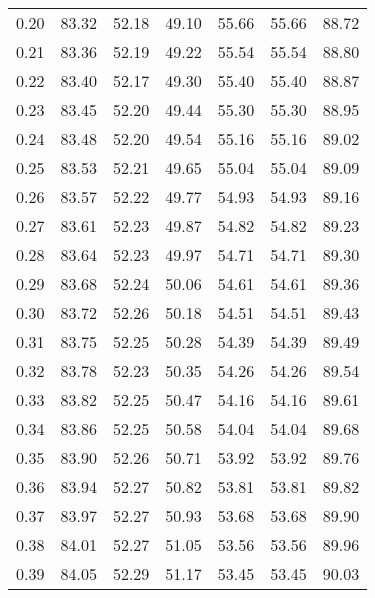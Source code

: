 \begin{tabular}{|c|c|c|c|c|c|c|}
      0.20 &     83.32 &     52.18 &      49.10 &   55.66 &      55.66 &         88.72 \\
      0.21 &     83.36 &     52.19 &      49.22 &   55.54 &      55.54 &         88.80 \\
      0.22 &     83.40 &     52.17 &      49.30 &   55.40 &      55.40 &         88.87 \\
      0.23 &     83.45 &     52.20 &      49.44 &   55.30 &      55.30 &         88.95 \\
      0.24 &     83.48 &     52.20 &      49.54 &   55.16 &      55.16 &         89.02 \\
      0.25 &     83.53 &     52.21 &      49.65 &   55.04 &      55.04 &         89.09 \\
      0.26 &     83.57 &     52.22 &      49.77 &   54.93 &      54.93 &         89.16 \\
      0.27 &     83.61 &     52.23 &      49.87 &   54.82 &      54.82 &         89.23 \\
      0.28 &     83.64 &     52.23 &      49.97 &   54.71 &      54.71 &         89.30 \\
      0.29 &     83.68 &     52.24 &      50.06 &   54.61 &      54.61 &         89.36 \\
      0.30 &     83.72 &     52.26 &      50.18 &   54.51 &      54.51 &         89.43 \\
      0.31 &     83.75 &     52.25 &      50.28 &   54.39 &      54.39 &         89.49 \\
      0.32 &     83.78 &     52.23 &      50.35 &   54.26 &      54.26 &         89.54 \\
      0.33 &     83.82 &     52.25 &      50.47 &   54.16 &      54.16 &         89.61 \\
      0.34 &     83.86 &     52.25 &      50.58 &   54.04 &      54.04 &         89.68 \\
      0.35 &     83.90 &     52.26 &      50.71 &   53.92 &      53.92 &         89.76 \\
      0.36 &     83.94 &     52.27 &      50.82 &   53.81 &      53.81 &         89.82 \\
      0.37 &     83.97 &     52.27 &      50.93 &   53.68 &      53.68 &         89.90 \\
      0.38 &     84.01 &     52.27 &      51.05 &   53.56 &      53.56 &         89.96 \\
      0.39 &     84.05 &     52.29 &      51.17 &   53.45 &      53.45 &         90.03 \\

\end{tabular}
